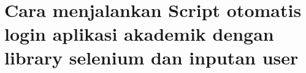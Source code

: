 \documentclass{article}
\begin{document}
\\
\\
\\
\\
\\
\\
\\
\\
\\
\\
\\
\\
\\
\\
\\
\\
\\
\\
\\
\\
\\
\\
\\
\\
\\
\\
\section{Cara menjalankan Script otomatis login aplikasi akademik dengan library selenium dan inputan user}
\end{document}
